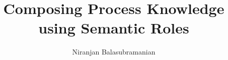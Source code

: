 \documentclass[11pt,onecolumn]{article}
\begin{document}

\title{Composing Process Knowledge using Semantic Roles}
\author{Niranjan Balasubramanian}
\maketitle
\newpage
\thispagestyle{empty}
\newpage
\tableofcontents    %
\thispagestyle{empty}
\setcounter{section}{0}
\setcounter{page}{0}
\newpage
%
\setcounter{page}{1}

%





{\small


}
\end{document}
